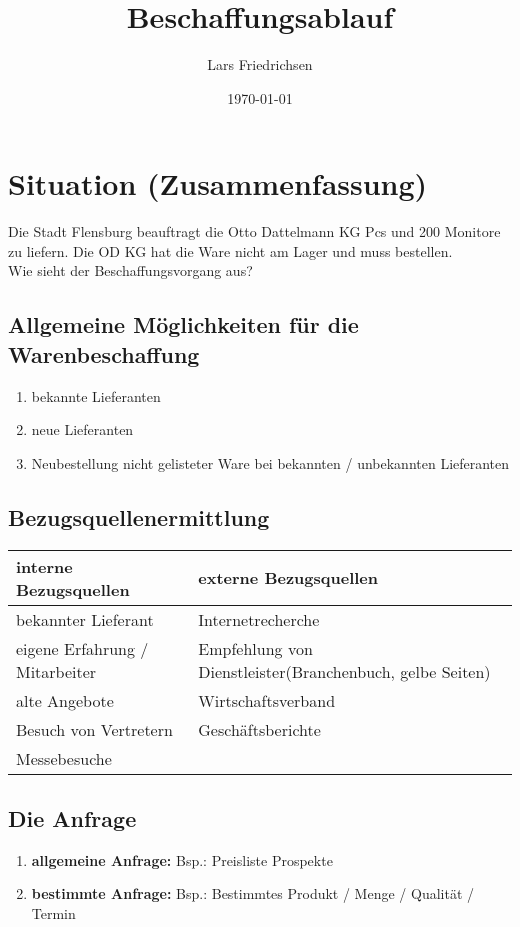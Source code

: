 \documentclass[a4paper,11pt]{scrartcl}	%
\title{Beschaffungsablauf}
\author{Lars Friedrichsen}
\date{\today}
\begin{document}
\section{Situation (Zusammenfassung)}

Die Stadt Flensburg beauftragt die \glqq Otto Dattelmann KG Pcs und 200 Monitore zu liefern.
Die OD KG hat die Ware nicht am Lager und muss bestellen. \\[0.5cm]
Wie sieht der Beschaffungsvorgang aus?
	\subsection{Allgemeine Möglichkeiten für die Warenbeschaffung}

		\begin{enumerate}
			\item bekannte Lieferanten
			\item neue Lieferanten
			\item Neubestellung nicht gelisteter Ware bei bekannten / unbekannten Lieferanten
		\end{enumerate}
		
	\subsection{Bezugsquellenermittlung}
	
		\begin{tabular}{|l|l|}
			\hline
			\textbf{interne Bezugsquellen}			&	\textbf{externe Bezugsquellen}\\ \hline
			bekannter Lieferant				&	Internetrecherche \\ \hline
			eigene Erfahrung / Mitarbeiter	&	Empfehlung von Dienstleister(Branchenbuch, gelbe Seiten)\\ \hline
			alte Angebote					&	Wirtschaftsverband \\ \hline
			Besuch von Vertretern			&	Geschäftsberichte \\ \hline
			Messebesuche						&	\\ \hline
		\end{tabular}

	\subsection{Die Anfrage}
	
		\begin{enumerate}
			\item \textbf{allgemeine Anfrage:} Bsp.: Preisliste Prospekte
			\item \textbf{bestimmte Anfrage:} Bsp.: Bestimmtes Produkt / Menge / Qualität / Termin
		\end{enumerate}
		
\end{document}
